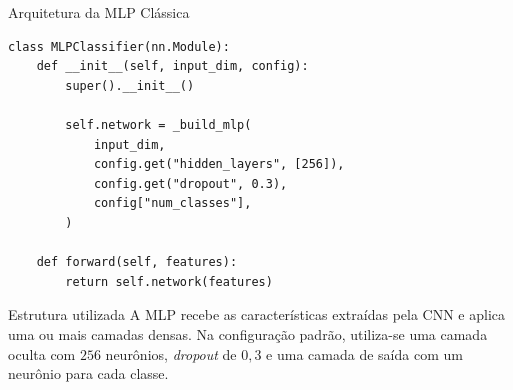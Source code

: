 \begin{frame}[fragile]{Arquitetura da MLP Clássica}

\begin{lstlisting}[style=pythonstyle]
class MLPClassifier(nn.Module):
    def __init__(self, input_dim, config):
        super().__init__()

        self.network = _build_mlp(
            input_dim,
            config.get("hidden_layers", [256]),
            config.get("dropout", 0.3),
            config["num_classes"],
        )

    def forward(self, features):
        return self.network(features)
\end{lstlisting}

\begin{block}{Estrutura utilizada}
A MLP recebe as características extraídas pela CNN e aplica uma ou mais
camadas densas. Na configuração padrão, utiliza-se uma camada oculta com
$256$ neurônios, \textit{dropout} de $0{,}3$ e uma camada de saída com um
neurônio para cada classe.
\end{block}

\end{frame}

